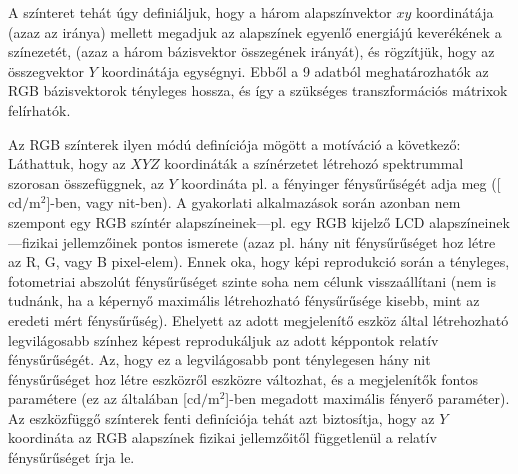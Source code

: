 A színteret tehát úgy definiáljuk, hogy a három alapszínvektor $xy$ koordinátája (azaz az iránya) mellett megadjuk az alapszínek egyenlő energiájú keverékének a színezetét, (azaz a három bázisvektor összegének irányát), és rögzítjük, hogy az összegvektor $Y$ koordinátája egységnyi.
Ebből a 9 adatból meghatározhatók az RGB bázisvektorok tényleges hossza, és így a szükséges transzformációs mátrixok felírhatók.

\vspace{3mm}
Az RGB színterek ilyen módú definíciója mögött a motíváció a következő:
Láthattuk, hogy az $XYZ$ koordináták a színérzetet létrehozó spektrummal szorosan összefüggnek, az $Y$ koordináta pl. a fényinger fénysűrűségét adja meg ([$\mathrm{cd}/\mathrm{m}^2$]-ben, vagy nit-ben).
A gyakorlati alkalmazások során azonban nem szempont egy RGB színtér alapszíneinek---pl. egy RGB kijelző LCD alapszíneinek---fizikai jellemzőinek pontos ismerete (azaz pl. hány nit fénysűrűséget hoz létre az R, G, vagy B pixel-elem).
Ennek oka, hogy képi reprodukció során a tényleges, fotometriai abszolút fénysűrűséget szinte soha nem célunk visszaállítani (nem is tudnánk, ha a képernyő maximális létrehozható fénysűrűsége kisebb, mint az eredeti mért fénysűrűség).
Ehelyett az adott megjelenítő eszköz által létrehozható legvilágosabb színhez képest reprodukáljuk az adott képpontok relatív fénysűrűségét.
Az, hogy ez a legvilágosabb pont ténylegesen hány nit fénysűrűséget hoz létre eszközről eszközre változhat, és a megjelenítők fontos paramétere (ez az általában [$\mathrm{cd}/\mathrm{m}^2$]-ben megadott maximális fényerő paraméter).
Az eszközfüggő színterek fenti definíciója tehát azt biztosítja, hogy az $Y$ koordináta az RGB alapszínek fizikai jellemzőitől függetlenül a relatív fénysűrűséget írja le.

